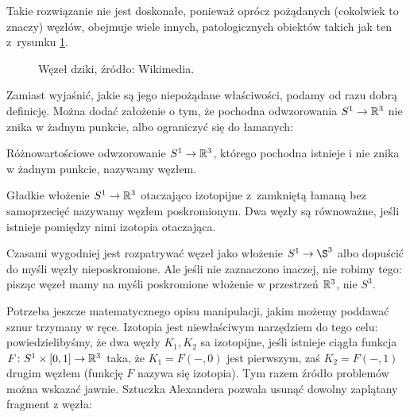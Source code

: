 Takie rozwiązanie nie jest doskonałe, ponieważ oprócz pożądanych (cokolwiek to znaczy) węzłów, obejmuje wiele innych, patologicznych obiektów takich jak ten z~rysunku \ref{fig_wild_knot}.

\begin{figure}[H]
    \centering

    \caption[caption-for-lof-1]{Węzeł dziki, źródło: Wikimedia{\footnotemark}.}
    \label{fig_wild_knot}
\end{figure}

Zamiast wyjaśnić, jakie są jego niepożądane właściwości, podamy od razu dobrą definicję.
Można dodać założenie o tym, że pochodna odwzorowania $S^1 \to \mathbb R^3$ nie znika w żadnym punkcie, albo ograniczyć się do łamanych:

\begin{definition}[węzeł]
    Różnowartościowe odwzorowanie $S^1 \to \mathbb R^3$, którego pochodna istnieje i nie znika w żadnym punkcie, nazywamy węzłem.
\end{definition}

\begin{definition}[węzeł?]
%
\label{def:knot}%
    Gładkie włożenie $S^1 \to \mathbb R^3$ otaczająco izotopijne z~zamkniętą łamaną bez samoprzecięć nazywamy węzłem poskromionym.
    Dwa węzły są równoważne, jeśli istnieje pomiędzy nimi izotopia otaczająca.
\end{definition}

Czasami wygodniej jest rozpatrywać węzeł jako włożenie $S^1 \to \S^3$ albo dopuścić do myśli węzły nieposkromione.
Ale jeśli nie zaznaczono inaczej, nie robimy tego: pisząc węzeł mamy na myśli poskromione włożenie w przestrzeń $\mathbb R^3$, nie $S^3$.

Potrzeba jeszcze matematycznego opisu manipulacji, jakim możemy poddawać sznur trzymany w ręce.
Izotopia jest niewłaściwym narzędziem do tego celu: powiedzielibyśmy, że dwa węzły $K_1, K_2$ sa izotopijne, jeśli istnieje ciągła funkcja $F \colon S^1 \times [0, 1] \to \mathbb R^3$ taka, że $K_1 = F(-, 0)$ jest pierwszym, zaś $K_2 = F(-,1)$ drugim węzłem (funkcję $F$ nazywa się izotopia).
Tym razem źródło problemów można wskazać jawnie.
Sztuczka Alexandera pozwala usunąć dowolny zaplątany fragment z węzła:

